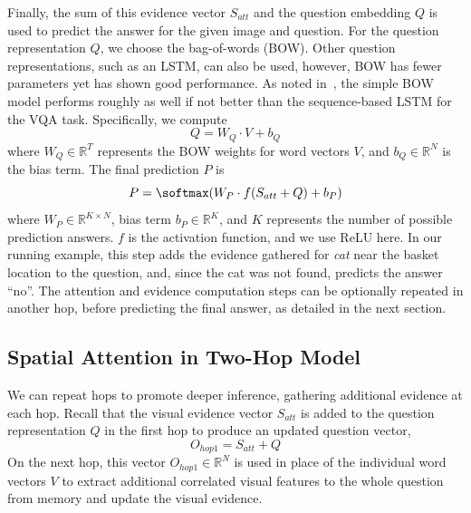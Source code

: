 Finally, the sum of this evidence vector $S_{att}$ and the question embedding $Q$ is used to predict the answer for the given image and question.
For the question representation $Q$, we choose the bag-of-words (BOW). Other question representations, such as an LSTM, can also be used, however, BOW has fewer parameters yet has shown good performance. As noted in~\cite{shih2015look}, the simple BOW model performs roughly as well if not better than the sequence-based LSTM for the VQA task. Specifically, we compute
\begin{equation}
Q = W_Q \cdot V + b_Q
\end{equation}
where $W_Q \in \mathbb{R}^T$ represents the BOW weights for word vectors $V$, and $b_Q \in \mathbb{R}^{N}$ is the bias term. The final prediction $P$ is
\begin{equation}
P = \softmax(W_P \cdot f(S_{att} + Q) + b_P)\label{eqn:predict}
\end{equation}
where $W_P \in \mathbb{R}^{K\times N}$, bias term $b_P \in \mathbb{R}^{K}$, and $K$ represents the number of possible prediction answers. $f$ is the activation function, and we use ReLU here.
In our running example, this step adds the evidence gathered for \textit{cat} near the basket location to the question, and, since the cat was not found, predicts the answer ``no''. 
The attention and evidence computation steps can be optionally repeated in another hop, before predicting the final answer, as detailed in the next section. 

\subsection{Spatial Attention in Two-Hop Model}\label{sec:att3}
We can repeat hops to promote deeper inference, gathering additional evidence at each hop. Recall that the visual evidence vector $S_{att}$ is added to the question representation $Q$ in the first hop to produce an updated question vector,
\begin{equation}{O_{hop1} = S_{att} + Q}\end{equation}
On the next hop, this vector $O_{hop1} \in \mathbb{R}^{N}$ is used in place of the individual word vectors $V$ to extract additional correlated visual features to the whole question from memory and update the visual evidence.

